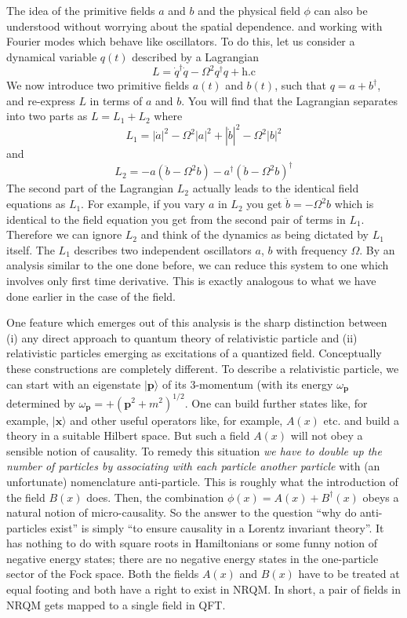 \documentclass{article}
\def\ket#1{|#1\rangle}                    %
\begin{document}
 The idea of the primitive fields $a$ and $b$ and the physical field $\phi$ can also be understood  without worrying about the spatial dependence. and working with Fourier modes which behave like oscillators. To do this, let us consider a dynamical variable $q(t)$ described by a Lagrangian
\begin{equation}
 L = \dot q^\dagger \dot q - \Omega^2 q^\dagger q + \text{h.c}
\end{equation} 
 We now introduce two primitive fields $a(t)$ and $b(t)$, such that $ q = a+b^\dagger$,
  and re-express $L$ in terms of $a$ and $b$.  You will find that the Lagrangian separates into two parts as $L=L_1+L_2$ where
  \begin{equation}
   L_1=|\dot a|^2 - \Omega^2 |a|^2+|\dot b|^2 - \Omega^2 |b|^2
  \end{equation} 
  and 
  \begin{equation}
   L_2=- a (\ddot b - \Omega^2 b) - a^\dagger (\ddot b - \Omega^2 b)^\dagger
  \end{equation} 
  The second part of the Lagrangian $L_2$ actually leads to the identical field equations as $L_1$. For example, if you vary $a$ in $L_2$ you get $\ddot b = -\Omega^2 b$ which is identical to the field equation you get from the second pair of terms in $L_1$. Therefore we can ignore $L_2$ and think of the dynamics as being dictated by $L_1$ itself. The $L_1$ describes two independent oscillators $a$, $b$ with frequency $\Omega$. By an analysis similar to the one done before, we can reduce this system to one which involves only first time derivative. This is exactly analogous to what we have done earlier in the case of the field.   

  
One feature which emerges out of this analysis is the sharp distinction between (i) any direct approach to quantum theory of relativistic particle  and (ii) relativistic particles emerging as excitations of a quantized field. Conceptually these constructions are completely different. To describe a relativistic particle, we can start with an eigenstate $\ket{\bm{p}}$ of its 3-momentum (with its energy $\omega_{\bm{p}}$  determined by $\omega_{\bm{p}} = + (\bm{p}^2 + m^2)^{1/2}$. One can build further states like, for example, $\ket{\bm{x}}$ and other useful operators like, for example, $A(x)$ etc. and build a theory in a suitable Hilbert space. But such a field $A(x)$ will not obey a sensible notion of causality. To remedy this situation \textit{we have to double up the number of particles by associating with each particle another particle} with (an unfortunate) nomenclature anti-particle. This is roughly what the introduction of the field $B(x)$ does. Then, the combination $\phi(x) = A(x) + B^\dagger(x)$ obeys a natural notion of micro-causality.  So the answer to the question ``why do anti-particles exist'' is simply ``to ensure causality in a Lorentz invariant theory''. It has nothing to do with square roots in Hamiltonians  or some funny notion of negative energy states; there are no negative energy states in the one-particle sector of the Fock space. Both the fields $A(x)$ and $B(x)$ have to be treated at equal footing and both have a  right to exist in NRQM. In short, a pair of fields in NRQM gets mapped to a single field in QFT.    
\end{document}
